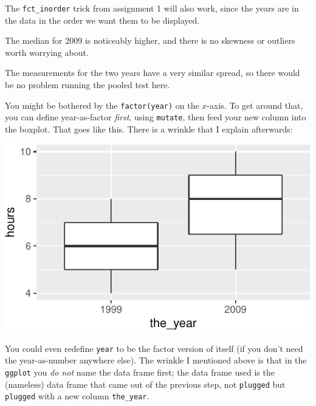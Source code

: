 \documentclass[]{tufte-book}
\newenvironment{Shaded}{}{}
\newcommand{\DataTypeTok}[1]{\textcolor[rgb]{0.56,0.13,0.00}{#1}}
\newcommand{\KeywordTok}[1]{\textcolor[rgb]{0.00,0.44,0.13}{\textbf{#1}}}
\newcommand{\NormalTok}[1]{#1}
\newcommand{\OperatorTok}[1]{\textcolor[rgb]{0.40,0.40,0.40}{#1}}
\newcommand{\StringTok}[1]{\textcolor[rgb]{0.25,0.44,0.63}{#1}}
\theoremstyle{definition}
\theoremstyle{definition}
\theoremstyle{definition}
\theoremstyle{remark}
\begin{document}
The \texttt{fct\_inorder} trick from assignment 1 will also work, since
the years are in the data in the order we want them to be displayed.

The median for 2009 is noticeably higher, and there is no skewness or
outliers worth worrying about.

The measurements for the two years have a very similar spread, so there
would be no problem running the pooled test here.

You might be bothered by the \texttt{factor(year)} on the \(x\)-axis. To
get around that, you can define year-as-factor \emph{first}, using
\texttt{mutate}, then feed your new column into the boxplot. That goes
like this. There is a wrinkle that I explain afterwards:

\begin{Shaded}
\end{Shaded}

\includegraphics{05-two-sample-inference_files/figure-latex/unnamed-chunk-6-1}

You could even redefine \texttt{year} to be the factor version of itself
(if you don't need the year-as-number anywhere else). The wrinkle I
mentioned above is that in the \texttt{ggplot} you \emph{do
not} name the data frame first; the data frame used is the (nameless)
data frame that came out of the previous step, not \texttt{plugged} but
\texttt{plugged} with a new column \texttt{the\_year}.
\end{document}
